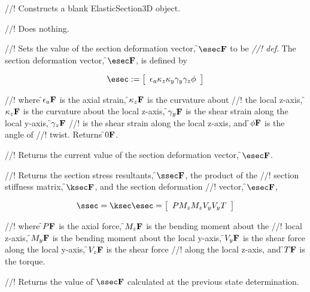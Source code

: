 //! Constructs a blank ElasticSection3D object.

//! Does nothing.

//! Sets the value of the section deformation vector, \f$\esec\f$ to be {\em
//! def}. The section deformation vector, \f$\esec\f$, is defined by

\begin{equation}
\esec := \left[
   \begin{array}{c}
       \epsilon_a
       \kappa_z
       \kappa_y
       \gamma_y
       \gamma_z
       \phi
   \end{array} 
 \right]
\end{equation}

//! where \f$\epsilon_a{\bf F}$ is the axial strain, \f$\kappa_z{\bf F}$ is the curvature about
//! the local z-axis, \f$\kappa_z{\bf F}$ is the curvature about the local z-axis, 
\f$\gamma_y{\bf F}$ is the shear strain along the local y-axis, \f$\gamma_z{\bf F}$
//! is the shear strain along the local z-axis, and \f$\phi{\bf F}$ is the angle of
//! twist. Returns \f$0{\bf F}$.

//! Returns the current value of the section deformation vector, \f$\esec\f$.

//! Returns the section stress resultants, \f$\ssec\f$, the product of the 
//! section stiffness matrix, \f$\ksec\f$, and the section deformation 
//! vector, \f$\esec\f$,

\begin{equation}
\ssec = \ksec \esec = \left[
   \begin{array}{c}
       P
       M_z
       M_z
       V_y
       V_y
       T
   \end{array} 
 \right]
\end{equation}

//! where \f$P{\bf F}$ is the axial force, \f$M_z{\bf F}$ is the bending moment about the
//! local z-axis, \f$M_y{\bf F}$ is the bending moment about the local y-axis, 
\f$V_y{\bf F}$ is the shear force along the local y-axis, \f$V_z{\bf F}$ is the shear force
//! along the local z-axis, and \f$T{\bf F}$ is the torque.

//! Returns the value of \f$\ssec\f$ calculated at the previous state determination.

